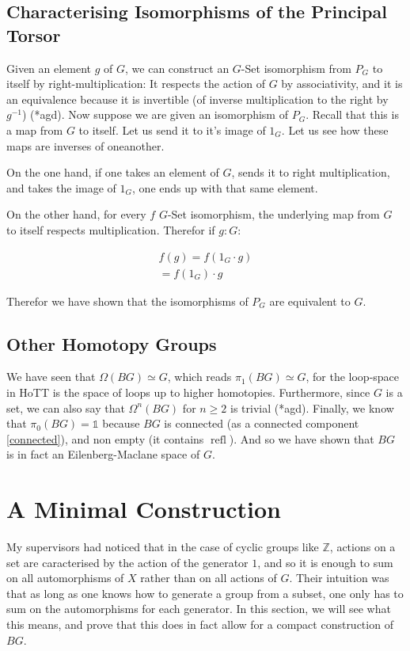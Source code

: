 \documentclass{article}
\DeclareMathOperator{\refl}{refl}
\begin{document}
\subsection{Characterising  Isomorphisms of the Principal Torsor}

Given an element $g$ of $G$, we can construct an $G$-Set isomorphism from $P_{G}$ to itself by right-multiplication: It respects the action of $G$ by associativity, and it is an equivalence because it is invertible (of inverse multiplication to the right by $g^{-1}$) (*agd). Now suppose we are given an isomorphism of $P_{G}$. Recall that this is a map from $G$ to itself. Let us send it to it's image of $1_{G}$. Let us see how these maps are inverses of oneanother.

On the one hand, if one takes an element of $G$, sends it to right multiplication, and takes the image of $1_{G}$, one ends up with that same element.

On the other hand, for every $f$ $G$-Set isomorphism, the underlying map from $G$ to itself respects multiplication. Therefor if $g : G$:

\begin{gather*}
  f(g) = f(1_{G} \cdot g) \\
  = f(1_{G}) \cdot g
\end{gather*}

Therefor we have shown that the isomorphisms of $P_{G}$ are equivalent to $G$.

\subsection{Other Homotopy Groups}

We have seen that $\Omega(BG) \simeq G$, which reads $\pi_1(BG) \simeq G$, for the loop-space in HoTT is the space of loops up to higher homotopies. Furthermore, since $G$ is a set, we can also say that $\Omega^{n}(BG)$ for $n \geq 2$ is trivial (*agd). Finally, we know that $\pi_{0}(BG) = \mathbb{1}$ because $BG$ is connected (as a connected component \ref{connected}), and non empty (it contains $\refl$). And so we have shown that $BG$ is in fact an Eilenberg-Maclane space of $G$.

\section{A Minimal Construction}

My supervisors had noticed that in the case of cyclic groups like $\mathbb{Z}$, actions on a set are caracterised by the action of the generator $1$, and so it is enough to sum on all automorphisms of $X$ rather than on all actions of $G$. Their intuition was that as long as one knows how to generate a group from a subset, one only has to sum on the automorphisms for each generator. In this section, we will see what this means, and prove that this does in fact allow for a compact construction of $BG$.
\end{document}
